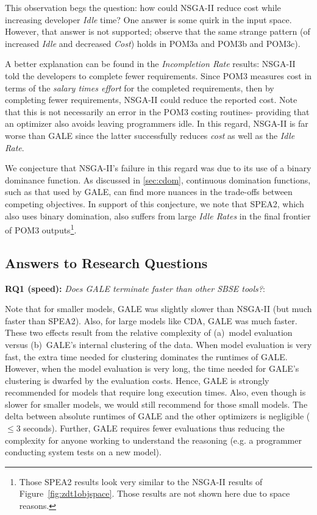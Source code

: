 \documentclass[10pt,journal,compsoc]{IEEEtran}
\newcommand{\tion}[1]{\textsection\ref{sec:#1}}
\newcommand{\fig}[1]{Figure~\ref{fig:#1}}
\begin{document}
This observation begs the question: how could
NSGA-II reduce cost while increasing developer {\em
  Idle} time?   One answer is some quirk in the input space.
However, that answer is not supported; observe that the same strange pattern
(of increased {\em Idle} and decreased {\em Cost}) holds
in POM3a and POM3b and POM3c).

A better explanation can be found in the  {\em Incompletion Rate}
results: NSGA-II told the developers to complete
fewer requirements. Since POM3 measures cost in
terms of the {\em salary times effort} for the
completed requirements, then by completing fewer
requirements, NSGA-II could reduce the reported cost.
Note that this is not necessarily an error in the  POM3 costing routines- providing that an optimizer
also avoids leaving programmers idle.
In this regard, NSGA-II is far worse than GALE since the latter
successfully reduces {\em cost} as well as the {\em Idle Rate}.

We conjecture that NSGA-II's failure in this regard
was due to its use of a binary dominance function. As discussed in \tion{cdom},
continuous domination functions, such as that used by GALE, can find more
nuances in the trade-offs between competing objectives.
In support of this conjecture, we note that SPEA2, which also uses binary domination,
also suffers from large {\em Idle Rates} in the final frontier of POM3 outputs\footnote{
Those SPEA2
results look very similar to the NSGA-II results of  \fig{zdt1objspace}.
Those results are not shown here due to space reasons.}.



\subsection{Answers to Research Questions}

{\bf RQ1 (speed):} {\em Does GALE terminate faster than other SBSE tools?}:

Note that 
for  smaller models, GALE was slightly slower than NSGA-II (but much faster than SPEA2).
Also, for large models like CDA, GALE was much faster.
These two effects result from the relative complexity
of (a)~model evaluation versus (b)~GALE's internal clustering of the data.
When model evaluation is very fast, the extra time needed for clustering
dominates the runtimes of GALE.  However, when the
model evaluation is very long, the time
needed for GALE's clustering is dwarfed by the evaluation costs. Hence,
GALE is strongly recommended for models that require long execution times.
Also, even though is slower for smaller models, we would still  recommend for those
small models.
The delta between absolute runtimes of GALE and the other optimizers is negligible ($\le 3$ seconds).
Further, GALE requires fewer evaluations thus reducing the complexity
for anyone working to understand the reasoning (e.g.  a
programmer conducting system tests on a new model).
\end{document}
